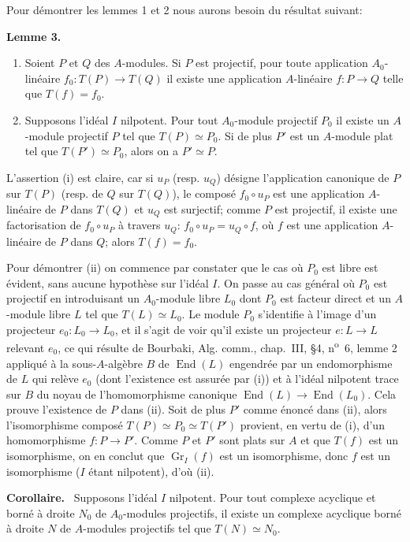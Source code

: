 \documentclass[11pt]{article}
\newenvironment{statement}[1]{\par\medskip\noindent\textbf{#1.}\ }{\par\medskip}
\providecommand{\End}{\operatorname{End}}
\providecommand{\End}{\operatorname{End}}
\begin{document}
Pour démontrer les lemmes 1 et 2 nous aurons besoin du résultat suivant:

\begin{statement}{Lemme 3}
\begin{enumerate}[label=(\roman*)]
\item Soient $P$ et $Q$ des $A$-modules. Si $P$ est projectif, pour toute application $A_0$-linéaire $f_0:T(P)\to T(Q)$ il existe une application $A$-linéaire $f:P\to Q$ telle que $T(f)=f_0$.
\item Supposons l'idéal $I$ nilpotent. Pour tout $A_0$-module projectif $P_0$ il existe un $A$-module projectif $P$ tel que $T(P)\simeq P_0$. Si de plus $P'$ est un $A$-module plat tel que $T(P')\simeq P_0$, alors on a $P'\simeq P$.
\end{enumerate}
\end{statement}

L'assertion (i) est claire, car si $u_P$ (resp. $u_Q$) désigne l'application canonique de $P$ sur $T(P)$ (resp. de $Q$ sur $T(Q)$), le composé $f_0\circ u_P$ est une application $A$-linéaire de $P$ dans $T(Q)$ et $u_Q$ est surjectif; comme $P$ est projectif, il existe une factorisation de $f_0\circ u_P$ à travers $u_Q$: $f_0\circ u_P=u_Q\circ f$, où $f$ est une application $A$-linéaire de $P$ dans $Q$; alors $T(f)=f_0$.

Pour démontrer (ii) on commence par constater que le cas où $P_0$ est libre est évident, sans aucune hypothèse sur l'idéal $I$. On passe au cas général où $P_0$ est projectif en introduisant un $A_0$-module libre $L_0$ dont $P_0$ est facteur direct et un $A$-module libre $L$ tel que $T(L)\simeq L_0$. Le module $P_0$ s'identifie à l'image d'un projecteur $e_0:L_0\to L_0$, et il s'agit de voir qu'il existe un projecteur $e:L\to L$ relevant $e_0$, ce qui résulte de Bourbaki, Alg. comm., chap.~III, §4, n\textsuperscript{o}~6, lemme 2 appliqué à la sous-$A$-algèbre $B$ de $\End(L)$ engendrée par un endomorphisme de $L$ qui relève $e_0$ (dont l'existence est assurée par (i)) et à l'idéal nilpotent trace sur $B$ du noyau de l'homomorphisme canonique $\End(L)\to\End(L_0)$. Cela prouve l'existence de $P$ dans (ii). Soit de plus $P'$ comme énoncé dans (ii), alors l'isomorphisme composé $T(P)\simeq P_0\simeq T(P')$ provient, en vertu de (i), d'un homomorphisme $f:P\to P'$. Comme $P$ et $P'$ sont plats sur $A$ et que $T(f)$ est un isomorphisme, on en conclut que $\operatorname{Gr}_I(f)$ est un isomorphisme, donc $f$ est un isomorphisme ($I$ étant nilpotent), d'où (ii).

\begin{statement}{Corollaire}
Supposons l'idéal $I$ nilpotent. Pour tout complexe acyclique et borné à droite $N_0$ de $A_0$-modules projectifs, il existe un complexe acyclique borné à droite $N$ de $A$-modules projectifs tel que $T(N)\simeq N_0$.
\end{statement}
\end{document}
